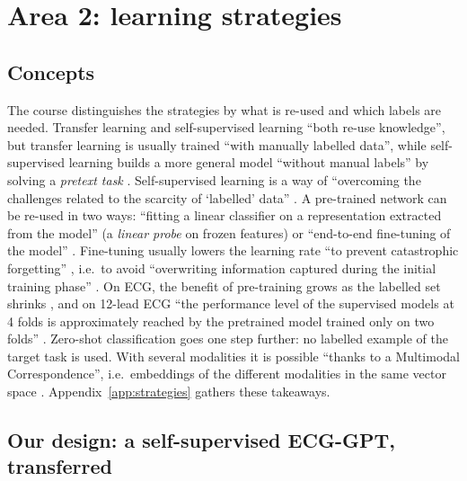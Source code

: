 \section{Area 2: learning strategies}\label{sec:strategies}

\subsection{Concepts}

The course distinguishes the strategies by what is re-used and which labels are needed. Transfer
learning and self-supervised learning ``both re-use knowledge'', but transfer learning is usually
trained ``with manually labelled data'', while self-supervised learning builds a more general model
``without manual labels'' by solving a \emph{pretext task} \cite{course_summary_0910}.
Self-supervised learning is a way of ``overcoming the challenges related to the scarcity of
`labelled' data'' \cite[p.~1]{soltanieh2022analysis}. A pre-trained network can be re-used in two
ways: ``fitting a linear classifier on a representation extracted from the model'' (a \emph{linear
probe} on frozen features) or ``end-to-end fine-tuning of the model'' \cite[p.~11]{radford2021learning}.
Fine-tuning usually lowers the learning rate ``to prevent catastrophic forgetting''
\cite[p.~6]{soltanieh2023indistribution}, i.e.\ to avoid ``overwriting information captured during the
initial training phase'' \cite[p.~1521]{strodthoff2021deep}. On ECG, the benefit of pre-training grows
as the labelled set shrinks \cite[p.~1524]{strodthoff2021deep}, and on 12-lead ECG ``the performance level of the supervised models at 4 folds is approximately
reached by the pretrained model trained only on two folds'' \cite[pp.~7--8]{mehari2022self}. Zero-shot classification goes one step further: no labelled
example of the target task is used. With several modalities it is possible ``thanks to a Multimodal
Correspondence'', i.e.\ embeddings of the different modalities in the same vector space
\cite{course_summary_0910}. Appendix~\ref{app:strategies} gathers these takeaways.

\subsection{Our design: a self-supervised ECG-GPT, transferred}

